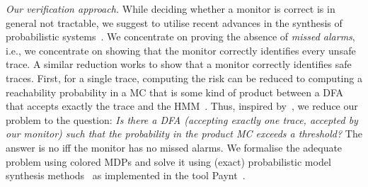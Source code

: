 \documentclass[runningheads]{llncs}
\renewcommand{\paragraph}[1]{\smallskip\noindent\emph{#1}}
\begin{document}
\paragraph{Our verification approach.}
While deciding whether a monitor is correct is in general not tractable, we suggest to utilise recent advances in the synthesis of probabilistic systems~\cite{andriushchenkoPAYNTToolInductive2021}.
We concentrate on proving the absence of \emph{missed alarms}, i.e., we concentrate on showing that the monitor correctly identifies every unsafe trace. A similar reduction works to show that a monitor correctly identifies safe traces.
First, for a single trace, computing the risk can be reduced to computing a reachability probability in a MC that is some kind of product between a DFA that accepts exactly the trace and the HMM~\cite{jungesRuntimeMonitorsMarkov2021}.
Thus, inspired by~\cite{DBLP:conf/tacas/BadingsVJSJ24}, we reduce our problem to the question: \emph{Is there a DFA (accepting exactly one trace, accepted by our monitor)
    such that the probability in the product MC exceeds a threshold?}
The answer is no iff the monitor has no missed alarms.
We formalise the adequate problem using colored MDPs and solve it using (exact) probabilistic model synthesis methods~\cite{DBLP:conf/uai/Andriushchenko022} as implemented in the tool Paynt~\cite{andriushchenkoPAYNTToolInductive2021}. %
\end{document}
